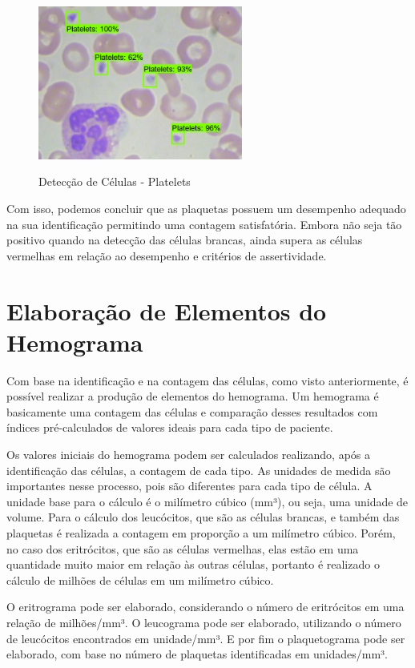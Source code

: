 \begin{figure}[!htb]
	\centering
	\caption{Detecção de Células - Platelets}
	\includegraphics[width=0.60\textwidth]{img/predict_platelets_2.jpeg}
	\label{fig:predict_platelets_2}
\end{figure}

Com isso, podemos concluir que as plaquetas possuem um desempenho adequado na sua identificação permitindo uma contagem satisfatória. Embora não seja tão positivo quando na detecção das células brancas, ainda supera as células vermelhas em relação ao desempenho e critérios de assertividade.

\section{Elaboração de Elementos do Hemograma}

Com base na identificação e na contagem das células, como visto anteriormente, é possível realizar a produção de elementos do hemograma. Um hemograma é basicamente uma contagem das células e comparação desses resultados com índices pré-calculados de valores ideais para cada tipo de paciente.

Os valores iniciais do hemograma podem ser calculados realizando, após a identificação das células, a contagem de cada tipo. As unidades de medida são importantes nesse processo, pois são diferentes para cada tipo de célula. A unidade base para o cálculo é o milímetro cúbico (mm³), ou seja, uma unidade de volume. Para o cálculo dos leucócitos, que são as células brancas, e também das plaquetas é realizada a contagem em proporção a um milímetro cúbico. Porém, no caso dos eritrócitos, que são as células vermelhas, elas estão em uma quantidade muito maior em relação às outras células, portanto é realizado o cálculo de milhões de células em um milímetro cúbico.

O eritrograma pode ser elaborado, considerando o número de eritrócitos em uma relação de milhões/mm³. O leucograma pode ser elaborado, utilizando o número de leucócitos encontrados em unidade/mm³. E por fim o plaquetograma pode ser elaborado, com base no número de plaquetas identificadas em unidades/mm³.

